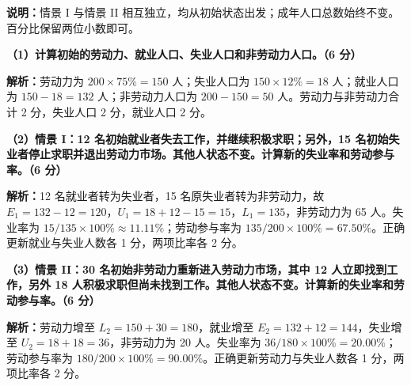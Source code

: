 \documentclass[UTF8,11pt,a4paper,fontset=fandol]{ctexart}
\newcommand{\ans}[1]{\par\textbf{解析：}#1\par}
\begin{document}
\textbf{说明：}情景 I 与情景 II 相互独立，均从初始状态出发；成年人口总数始终不变。百分比保留两位小数即可。

\textbf{（1）计算初始的劳动力、就业人口、失业人口和非劳动力人口。（6 分）}
\ans{劳动力为 $200\times75\%=150$ 人；失业人口为 $150\times12\%=18$ 人；就业人口为 $150-18=132$ 人；非劳动力人口为 $200-150=50$ 人。劳动力与非劳动力合计 2 分，失业人口 2 分，就业人口 2 分。}

\textbf{（2）情景 I：12 名初始就业者失去工作，并继续积极求职；另外，15 名初始失业者停止求职并退出劳动力市场。其他人状态不变。计算新的失业率和劳动参与率。（6 分）}
\ans{12 名就业者转为失业者，15 名原失业者转为非劳动力，故 $E_1=132-12=120$，$U_1=18+12-15=15$，$L_1=135$，非劳动力为 65 人。失业率为 $15/135\times100\%\approx11.11\%$；劳动参与率为 $135/200\times100\%=67.50\%$。正确更新就业与失业人数各 1 分，两项比率各 2 分。}

\textbf{（3）情景 II：30 名初始非劳动力重新进入劳动力市场，其中 12 人立即找到工作，另外 18 人积极求职但尚未找到工作。其他人状态不变。计算新的失业率和劳动参与率。（6 分）}
\ans{劳动力增至 $L_2=150+30=180$，就业增至 $E_2=132+12=144$，失业增至 $U_2=18+18=36$，非劳动力为 20 人。失业率为 $36/180\times100\%=20.00\%$；劳动参与率为 $180/200\times100\%=90.00\%$。正确更新劳动力与失业人数各 1 分，两项比率各 2 分。}
\end{document}
